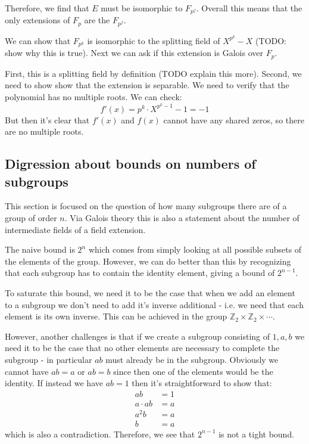 \documentclass{article}
\begin{document}
Therefore, we find that $ E $ must be isomorphic to $ F_{p^{f}} $. Overall this means that the only extensions of $ F_{p} $ are the $ F_{p^{f}} $.

We can show that $ F_{p^{k}} $ is isomorphic to the splitting field of $ X^{p^{k}} - X $ (TODO: show why this is true). Next we can ask if this extension is Galois over $ F_{p} $.

First, this is a splitting field by definition (TODO explain this more).
Second, we need to show show that the extension is separable. We need to verify that the polynomial has no multiple roots. We can check:
\begin{equation}
f'(x) = p^{k}\cdot X^{p^{k} - 1} - 1 = - 1
\end{equation}
But then it's clear that $f'(x)$ and $f(x)$ cannot have any shared zeros, so there are no multiple roots.

\subsection{Digression about bounds on numbers of subgroups}
This section is focused on the question of how many subgroups there are of a group of order $ n $. Via Galois theory this is also a statement about the number of intermediate fields of a field extension.

The naive bound is $ 2^{n} $ which comes from simply looking at all possible subsets of the elements of the group. However, we can do better than this by recognizing that each subgroup has to contain the identity element, giving a bound of $ 2^{n-1} $.

To saturate this bound, we need it to be the case that when we add an element to a subgroup we don't need to add it's inverse additional - i.e. we need that each element is its own inverse. This can be achieved in the group $ \mathbb{Z}_{2} \times \mathbb{Z}_{2} \times \cdots $.

However, another challenges is that if we create a subgroup consisting of $ 1, a, b $ we need it to be the case that no other elements are necessary to complete the subgroup - in particular $ab$ must already be in the subgroup. Obviously we cannot have $ ab = a$ or $ab = b$ since then one of the elements would be the identity. If instead we have $ab = 1$ then it's straightforward to show that:
\begin{subequations}
\begin{align}
ab & = 1 \\
a\cdot ab &= a \\
a^{2}b & = a \\
b & = a
\end{align}
\end{subequations}
which is also a contradiction. Therefore, we see that $2^{n-1}$ is not a tight bound.
\end{document}

